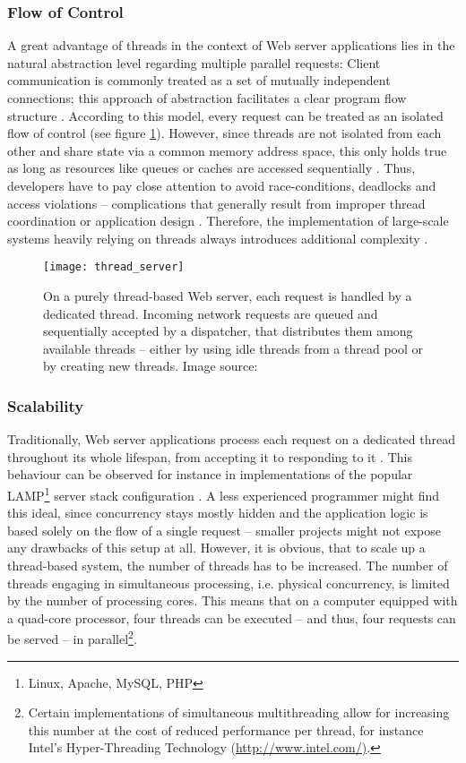 \subsubsection*{Flow of Control}
A great advantage of threads in the context of Web server applications lies in the natural abstraction level regarding multiple parallel requests: Client communication is commonly treated as a set of mutually independent connections; this approach of abstraction facilitates a clear program flow structure \cite{Veal2007}. According to this model, every request can be treated as an isolated flow of control (see figure \ref{fig:thread_server}). However, since threads are not isolated from each other and share state via a common memory address space, this only holds true as long as resources like queues or caches are accessed sequentially \cite[p. 2]{Behren2003}. Thus, developers have to pay close attention to avoid race-conditions, deadlocks and access violations -- complications that generally result from improper thread coordination or application design \cite[p. 1]{Fischer2007}. Therefore, the implementation of large-scale systems heavily relying on threads always introduces additional complexity \cite[p. 1]{Lee2006}.

\begin{figure}
\centering\small
\setlength{\tabcolsep}{0mm}
  \texttt{[image: thread\_server]}
\caption{
On a purely thread-based Web server, each request is handled by a dedicated thread. Incoming network requests are queued and sequentially accepted by a dispatcher, that distributes them among available threads -- either by using idle threads from a thread pool or by creating new threads. Image source: \cite{Welsh2001}
}
\label{fig:thread_server}
\end{figure}

\subsubsection*{Scalability}
Traditionally, Web server applications process each request on a dedicated thread throughout its whole lifespan, from accepting it to responding to it \cite[p. 162]{Henderson2006}. This behaviour can be observed for instance in implementations of the popular LAMP\footnote{Linux, Apache, MySQL, PHP} server stack configuration \cite[p. 48]{Henderson2006}. A less experienced programmer might find this ideal, since concurrency stays mostly hidden and the application logic is based solely on the flow of a single request -- smaller projects might not expose any drawbacks of this setup at all. However, it is obvious, that to scale up a thread-based system, the number of threads has to be increased. The number of threads engaging in simultaneous processing, i.e. physical concurrency, is limited by the number of processing cores. This means that on a computer equipped with a quad-core processor, four threads can be executed -- and thus, four requests can be served -- in parallel\footnote{\label{lab:hyper}Certain implementations of simultaneous multithreading allow for increasing this number at the cost of reduced performance per thread, for instance Intel's Hyper-Threading Technology (\url{http://www.intel.com/)}.}.


